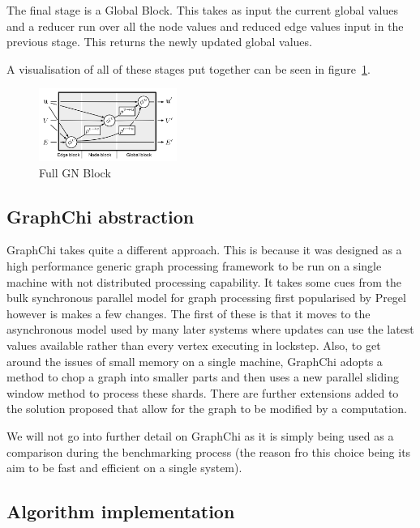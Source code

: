 \documentclass[sigconf,nonacm]{acmart}
\begin{document}
The final stage is a Global Block. This takes as input the current global values and a reducer run over all the node values and reduced edge values input in the previous stage. This returns the newly updated global values.

A visualisation of all of these stages put together can be seen in figure~\ref{fig:graph-nets-block}.

\begin{figure}[H]
    \centering
    \includegraphics[width=0.4\textwidth]{graph-nets-full.png}
    \caption{Full GN Block}
    \label{fig:graph-nets-block}
\end{figure}

\subsection{GraphChi abstraction}

GraphChi takes quite a different approach. This is because it was designed as a high performance generic graph processing framework to be run on a single machine with not distributed processing capability. It takes some cues from the bulk synchronous parallel model for graph processing first popularised by Pregel\cite{pregel} however is makes a few changes. The first of these is that it moves to the asynchronous model used by many later systems where updates can use the latest values available rather than every vertex executing in lockstep. Also, to get around the issues of small memory on a single machine, GraphChi adopts a method to chop a graph into smaller parts and then uses a new parallel sliding window method to process these shards. There are further extensions added to the solution proposed that allow for the graph to be modified by a computation.

 We will not go into further detail on GraphChi as it is simply being used as a comparison during the benchmarking process (the reason fro this choice being its aim to be fast and efficient on a single system).

\subsection{Algorithm implementation}
\end{document}
